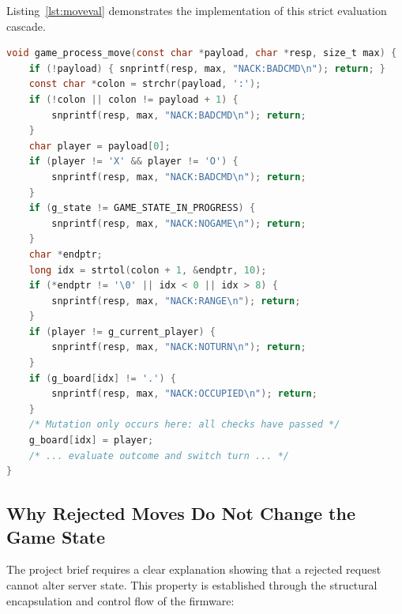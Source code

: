 Listing~\ref{lst:moveval} demonstrates the implementation of this strict evaluation cascade.

\begin{lstlisting}[language=C, caption={Move validation pipeline in \texttt{game\_process\_move()} (\texttt{game.c}).}, label=lst:moveval]
void game_process_move(const char *payload, char *resp, size_t max) {
    if (!payload) { snprintf(resp, max, "NACK:BADCMD\n"); return; }
    const char *colon = strchr(payload, ':');
    if (!colon || colon != payload + 1) {
        snprintf(resp, max, "NACK:BADCMD\n"); return;
    }
    char player = payload[0];
    if (player != 'X' && player != 'O') {
        snprintf(resp, max, "NACK:BADCMD\n"); return;
    }
    if (g_state != GAME_STATE_IN_PROGRESS) {
        snprintf(resp, max, "NACK:NOGAME\n"); return;
    }
    char *endptr;
    long idx = strtol(colon + 1, &endptr, 10);
    if (*endptr != '\0' || idx < 0 || idx > 8) {
        snprintf(resp, max, "NACK:RANGE\n"); return;
    }
    if (player != g_current_player) {
        snprintf(resp, max, "NACK:NOTURN\n"); return;
    }
    if (g_board[idx] != '.') {
        snprintf(resp, max, "NACK:OCCUPIED\n"); return;
    }
    /* Mutation only occurs here: all checks have passed */
    g_board[idx] = player;
    /* ... evaluate outcome and switch turn ... */
}
\end{lstlisting}

\subsection{Why Rejected Moves Do Not Change the Game State}

The project brief requires a clear explanation showing that a rejected request cannot alter server state.
This property is established through the structural encapsulation and control flow of the firmware:

